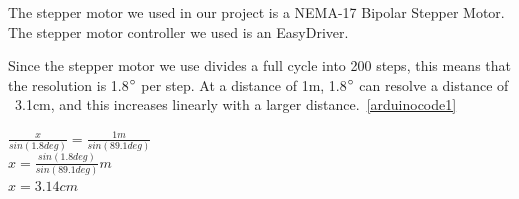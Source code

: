 The stepper motor we used in our project is a NEMA-17 Bipolar Stepper Motor. \cite{steppermotor}
The stepper motor controller we used is an EasyDriver.\cite{steppercontroller}



Since the stepper motor we use divides a full cycle into 200 steps, this means that the resolution is 1.8$\degree$ per step. At a distance of 1m, 1.8$\degree$ can resolve a distance of ~3.1cm, and this increases linearly with a larger distance.~\ref{arduinocode1}

$\frac{x}{sin(1.8deg)} = \frac{1m}{sin(89.1deg)}$ \\
$x = \frac{sin(1.8deg)}{sin(89.1deg)}m$ \\
$x = 3.14cm$ \\


